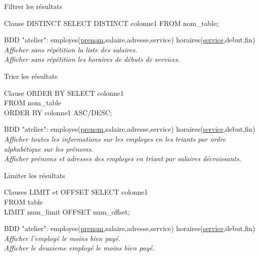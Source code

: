 \documentclass[xetex,dvipsnames]{beamer}
\begin{document}
\begin{frame}[t]{Filtrer les résultats}
	
	\begin{alertblock}{Clause DISTINCT}
		SELECT DISTINCT colonne1 FROM nom\_table;
	\end{alertblock}
	
\begin{scriptsize}
		\vspace{1em}
		BDD "atelier": employes(\underline{prenom},salaire,adresse,service) horaires(\underline{service},debut,fin)\\
		\vspace{0.5em}
		\textit{Afficher sans répétition la liste des salaires.}\\
		\textit{Afficher sans répétition les horaires de débuts de services.}\\
\end{scriptsize}
\end{frame}


\begin{frame}[t]{Trier les résultats}

	\begin{alertblock}{Clause ORDER BY}
		SELECT colonne1\\FROM nom\_table\\ORDER BY colonne1 ASC/DESC;
	\end{alertblock}
	
\begin{scriptsize}
		\vspace{1em}
		BDD "atelier": employes(\underline{prenom},salaire,adresse,service) horaires(\underline{service},debut,fin)\\
		\vspace{0.5em}
		\textit{Afficher toutes les informations sur les employes en les triants par ordre alphabétique sur les prénoms.}\\
		\textit{Afficher prénoms et adresses des employes en triant par salaires décroissants.}\\
\end{scriptsize}
\end{frame}


\begin{frame}[t]{Limiter les résultats}

	\begin{alertblock}{Clauses LIMIT et OFFSET}
		SELECT colonne1 \\FROM table \\LIMIT num\_limit OFFSET num\_offset;
	\end{alertblock}
\begin{scriptsize}
		\vspace{1em}
		BDD "atelier": employes(\underline{prenom},salaire,adresse,service) horaires(\underline{service},debut,fin)\\
		\vspace{0.5em}
		\textit{Afficher l'employé le moins bien payé.}\\
		\textit{Afficher le deuxieme employé le moins bien payé.}\\
\end{scriptsize}
\end{frame}
\end{document}
